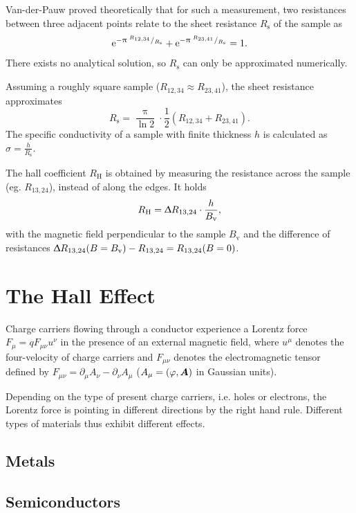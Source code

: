 Van-der-Pauw proved theoretically that for such a measurement, two resistances between three adjacent points relate to the sheet resistance $R_\text{s}$ of the sample as
\begin{equation}
	\mathrm{e}^{- \uppi \; ^{R_{12,34}}/_{R_\text{s}}} + \mathrm{e}^{- \uppi \; ^{R_{23,41}}/_{R_\text{s}}} = 1.
\end{equation}
There exists no analytical solution, so $R_\text{s}$ can only be approximated numerically.

Assuming a roughly square sample ($R_{12,34} \approx R_{23,41}$), the sheet resistance approximates
\begin{equation*}
	R_\text{s} = \frac{\uppi}{\ln 2} \cdot \frac{1}{2} \left( R_{12,34} + R_{23,41} \right).
\end{equation*}
The specific conductivity of a sample with finite thickness $h$ is calculated as $\sigma = \frac{h}{R_\text{s}}$.

The hall coefficient $R_\text{H}$ is obtained by measuring the resistance across the sample (eg. $R_{13,24}$), instead of along the edges.
It holds
\begin{equation*}
	R_\text{H} = \Updelta R_{13,24} \cdot \frac{h}{B_\text{v}},
\end{equation*}
with the magnetic field perpendicular to the sample $B_\text{v}$ and the difference of resistances $\Updelta R_{13,24}(B = B_\text{v}) - R_{13,24} = R_{13,24}(B = 0)$.

\section{The Hall Effect}
Charge carriers flowing through a conductor experience a Lorentz force $F_\mu = qF_{\mu\nu}u^\nu$ in the presence of an external magnetic field, where $u^\mu$ denotes the four-velocity of charge carriers and $F_{\mu\nu}$ denotes the electromagnetic tensor defined by $F_{\mu\nu} = \partial_\mu A_\nu - \partial_\nu A_\mu$ ($A_\mu = \left(\varphi, \boldsymbol{A}\right)$ in Gaussian units).

Depending on the type of present charge carriers, i.e. holes or electrons, the Lorentz force is pointing in different directions by the right hand rule.
Different types of materials thus exhibit different effects.

\subsection{Metals}

\subsection{Semiconductors}
